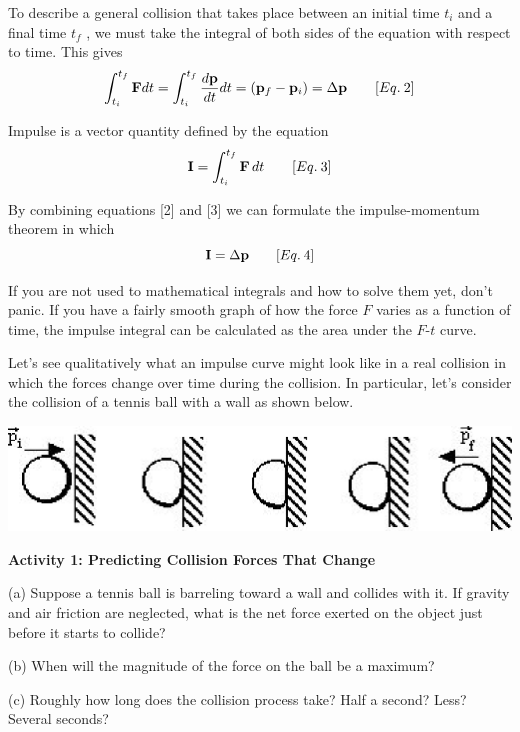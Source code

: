 To describe a general collision that takes place between an initial time \( t_{i} \)
and a final time \( t_{f} \) , we must take the integral of both sides of the
equation with respect to time. This gives
\[
\int _{t_{i}}^{t_{f}}{\bf F}dt=\int _{t_{i}}^{t_{f}}\frac{d{\bf p}}{dt}dt=\left( {{\bf p}_{f}}-{{\bf p}_{i}}\right) =\Delta {\bf p}\qquad [Eq.\: 2]\]


Impulse is a vector quantity defined by the equation
\[
{\bf I}=\int_{t_{i}}^{t_{f}}{\bf F}\,dt\qquad [Eq.\: 3]\]


By combining equations {[}2{]} and {[}3{]} we can formulate the impulse-momentum
theorem in which
\[
{\bf I}=\Delta {\bf p}\qquad [Eq.\: 4]\]


If you are not used to mathematical integrals and how to solve them yet, don't
panic. If you have a fairly smooth graph of how the force $F$ varies as a function
of time, the impulse integral can be calculated as the area under the $F$-$t$ 
curve.

Let's see qualitatively what an impulse curve might look like in a real collision
in which the forces change over time during the collision. In particular, let's
consider the collision of a tennis ball with a wall as shown below.

\vspace{0.3cm}
{\par\centering \includegraphics{impulse/impulse_fig1.eps} \par}
\vspace{0.3cm}

\textbf{Activity 1: Predicting Collision Forces That Change }

(a) Suppose a tennis ball is barreling toward a wall and collides with it. If gravity and air friction are neglected, what is the net force exerted on the object just before it starts to collide?
\vspace{10mm}

(b) When will the magnitude of the force on the ball be a maximum? 
\vspace{10mm}

(c) Roughly how long does the collision process take? Half a second? Less? Several
seconds?
\vspace{10mm}


